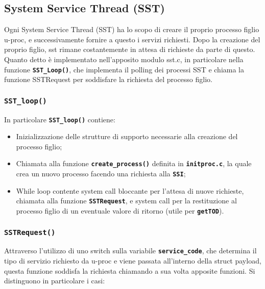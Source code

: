 \documentclass{article}
\begin{document}
	\newpage
	\subsection{System Service Thread (SST)}
	Ogni System Service Thread (SST) ha lo scopo di creare il proprio processo figlio
	u-proc, e successivamente fornire a questo i servizi richiesti. Dopo la creazione
	del proprio figlio, sst rimane costantemente in attesa di richieste da parte
	di questo. Quanto detto è implementato nell'apposito modulo sst.c, in
	particolare nella funzione \texttt{\textbf{SST\_Loop()}}, che implementa il
	polling dei processi SST e chiama la funzione SSTRequest per soddisfare la
	richiesta del processo figlio.

	\subsubsection{\texttt{\textbf{SST\_loop()}}}
	In particolare \texttt{\textbf{SST\_loop()}} contiene:
	\begin{itemize}
		\item Inizializzazione delle strutture di supporto necessarie alla creazione
			del processo figlio;

		\item Chiamata alla funzione \texttt{\textbf{create\_process()}} definita in
			\texttt{\textbf{initproc.c}}, la quale crea un nuovo processo facendo una
			richiesta alla \texttt{\textbf{SSI}};

		\item While loop contente system call bloccante per l’attesa di nuove richieste,
			chiamata alla funzione \texttt{\textbf{SSTRequest}}, e system call per la
			restituzione al processo figlio di un eventuale valore di ritorno (utile per
			\texttt{\textbf{getTOD}}).
	\end{itemize}

	\subsubsection{\texttt{\textbf{SSTRequest()}}}
	Attraverso l'utilizzo di uno switch sulla variabile \texttt{\textbf{service\_code}},
	che determina il tipo di servizio richiesto da u-proc e viene passata all’interno
	della struct payload, questa funzione soddisfa la richiesta chiamando a sua
	volta apposite funzioni. Si distinguono in particolare i casi:
\end{document}

